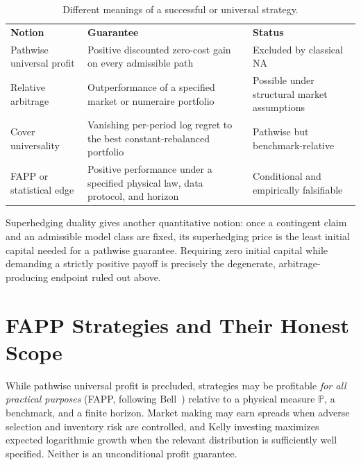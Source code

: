 \documentclass[aps,pra,reprint,superscriptaddress,amsmath,amssymb,floatfix]{revtex4-2}
\theoremstyle{plain}
\theoremstyle{definition}
\theoremstyle{remark}
\begin{document}
\begin{table}[ht]
\caption{\label{tab:hierarchy}Different meanings of a successful or universal strategy.}
\centering
\begin{ruledtabular}
\begin{tabular}{p{}p{}p{}}
\textbf{Notion} & \textbf{Guarantee} & \textbf{Status} \\
\colrule
Pathwise universal profit
& Positive discounted zero-cost gain on every admissible path
& Excluded by classical NA \\
Relative arbitrage
& Outperformance of a specified market or numeraire portfolio
& Possible under structural market assumptions \\
Cover universality
& Vanishing per-period log regret to the best constant-rebalanced portfolio
& Pathwise but benchmark-relative \\
FAPP or statistical edge
& Positive performance under a specified physical law, data protocol, and horizon
& Conditional and empirically falsifiable \\
\end{tabular}
\end{ruledtabular}
\end{table}

Superhedging duality gives another quantitative notion: once a contingent
claim and an admissible model class are fixed, its superhedging price is the
least initial capital needed for a pathwise guarantee. Requiring zero initial
capital while demanding a strictly positive payoff is precisely the
degenerate, arbitrage-producing endpoint ruled out above.

\section{FAPP Strategies and Their Honest Scope}
\label{sec:fapp}

While pathwise universal profit is precluded, strategies may be profitable
\emph{for all practical purposes} (FAPP, following Bell~\cite{bell-a})
relative to a physical measure \(\mathbb{P}\), a benchmark, and a finite
horizon. Market making may earn spreads when adverse selection and inventory
risk are controlled, and Kelly investing maximizes expected logarithmic
growth when the relevant distribution is sufficiently well specified. Neither
is an unconditional profit guarantee.
\end{document}
